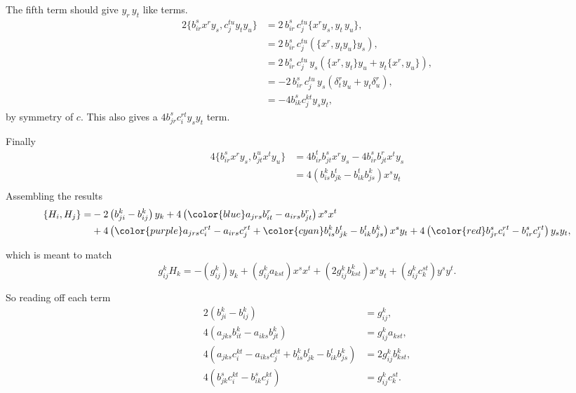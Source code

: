 \documentclass{article}
\begin{document}
    The fifth term should give \(y_r\, y_t\) like terms. 
    {\color{red}
    \begin{align*}
        2 \{ b_{ir}^s x^r y_s , c_{j}^{t u} y_t y_u \} &= 2 \,b_{ir}^s \,c_j^{tu} \{ x^r y_s , y_t \,y_u\} ,\\
                                                       &= 2 \,b_{ir}^s \,c_j^{tu} \left( \{ x^r, y_t y_u \} y_s \right) ,\\
                                                       &= 2 \,b_{ir}^s \,c_j^{tu} \, y_s \left( \{ x^r, y_t \} y_u + y_t \{ x^r , y_u \} \right) ,\\
                                                       &= -2 \,b_{ir}^s \,c_j^{tu} \, y_s \left( \delta^r_t y_u + y_t \delta^r_u \right) ,\\
                                                       &= -4 b_{ik}^s c_j^{kt} y_s y_t,
    \end{align*}
    }
    by symmetry of \(c\). This also gives a \(4 b_{jr}^s c_i^{rt} y_s y_t\) term.
    
    Finally 
    {\color{cyan}
    \begin{align*}
        4 \{ b_{ir}^s x^r y_s ,b_{jt}^u x^t y_u\}& = 4 b_{ir}^t b_{jt}^s x^r y_s - 4 b_{ir}^s b_{jt}^r x^t y_s \\
                                                 &= 4 \left(   b_{is}^k b_{jk}^t  - b_{ik}^t b_{js}^k \right) x^s y_t \\
    \end{align*}
    }
    Assembling the results
    \begin{align} \{H_i, H_j\} =& - 2\left(  b_{ji}^k - b_{ij}^k \right) y_k  +  4 \left( {\color{blue} a_{jrs} b_{it}^r -  a_{irs} b_{jt}^r } \right)x^s x^t \\
                                &+ 4\left( { \color{purple}a_{jrs} c_i^{r t} -  a_{irs} c_j^{r t}} +  {\color{cyan} b_{is}^k b_{jk}^t  -  b_{ik}^t b_{js}^k }\right) x^s y_t + 4 \left( {\color{red} b_{jr}^s c_i^{rt}  - b_{ir}^s c_j^{rt} }\right) y_s y_t,  
    \end{align}
    
    which is meant to match 
    \[ g_{ij}^k H_k = - \left( g_{ij}^k  \right) y_k + \left( g_{ij}^k  a_{kst} \right) x^s x^t + \left( 2 g_{ij}^k b_{k s t}^k \right) x^s y_t + \left( g_{ij}^k c_k^{st}\right) y^s y^t. \]
    
    So reading off each term
    \begin{align*}
       2 \left(  b_{ji}^k - b_{ij}^k \right) &= g_{ij}^k,\\
       4\left( a_{jks} b_{it}^k -  a_{iks} b_{jt}^k \right) &=  g_{ij}^k  a_{kst}, \\
       4\left(  a_{jks} c_i^{k t} -  a_{ik s} c_j^{k t} +  b_{is}^k b_{jk}^t  -  b_{ik}^t b_{js}^k \right) & = 2 g_{ij}^k b_{k s t}^k, \\ 
       4 \left( b_{jk}^s c_i^{kt}  - b_{ik}^s c_j^{kt}\right) &= g_{ij}^k c_k^{st}.
    \end{align*}
    
\end{document}
